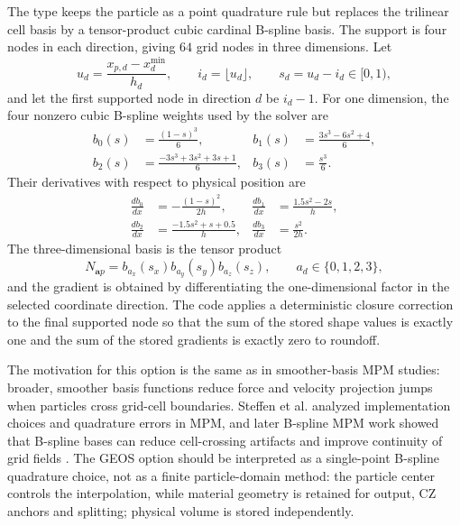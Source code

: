 The  type keeps the particle as a point quadrature rule but replaces the trilinear cell basis by a tensor-product cubic cardinal B-spline basis.  The support is four nodes in each direction, giving $64$ grid nodes in three dimensions.  Let
\begin{equation}
  u_d = \frac{x_{p,d}-x^{\min}_d}{h_d},
  \qquad
  i_d=\lfloor u_d\rfloor,
  \qquad
  s_d=u_d-i_d\in[0,1),
\end{equation}
and let the first supported node in direction $d$ be $i_d-1$.  For one dimension, the four nonzero cubic B-spline weights used by the solver are
\begin{align}
  b_0(s) &= \frac{(1-s)^3}{6},
  &
  b_1(s) &= \frac{3s^3-6s^2+4}{6},
  \label{eq:bspline-cubic-weights-a}\\
  b_2(s) &= \frac{-3s^3+3s^2+3s+1}{6},
  &
  b_3(s) &= \frac{s^3}{6}.
  \label{eq:bspline-cubic-weights-b}
\end{align}
Their derivatives with respect to physical position are
\begin{align}
  \frac{db_0}{dx} &= -\frac{(1-s)^2}{2h},
  &
  \frac{db_1}{dx} &= \frac{1.5s^2-2s}{h},
  \label{eq:bspline-cubic-grads-a}\\
  \frac{db_2}{dx} &= \frac{-1.5s^2+s+0.5}{h},
  &
  \frac{db_3}{dx} &= \frac{s^2}{2h}.
  \label{eq:bspline-cubic-grads-b}
\end{align}
The three-dimensional basis is the tensor product
\begin{equation}
  N_{\boldsymbol{a}p}=b_{a_x}(s_x)b_{a_y}(s_y)b_{a_z}(s_z),
  \qquad
  a_d\in\{0,1,2,3\},
  \label{eq:bspline-tensor-product}
\end{equation}
and the gradient is obtained by differentiating the one-dimensional factor in the selected coordinate direction.  The code applies a deterministic closure correction to the final supported node so that the sum of the stored shape values is exactly one and the sum of the stored gradients is exactly zero to roundoff.

The motivation for this option is the same as in smoother-basis MPM studies: broader, smoother basis functions reduce force and velocity projection jumps when particles cross grid-cell boundaries.  Steffen et al. analyzed implementation choices and quadrature errors in MPM, and later B-spline MPM work showed that B-spline bases can reduce cell-crossing artifacts and improve continuity of grid fields \cite{steffen2008quadrature,steffen2008choices,gan2018bspline}.  The GEOS option should be interpreted as a single-point B-spline quadrature choice, not as a finite particle-domain method: the particle center controls the interpolation, while material geometry is retained for output, CZ anchors and splitting; physical volume is stored independently.

